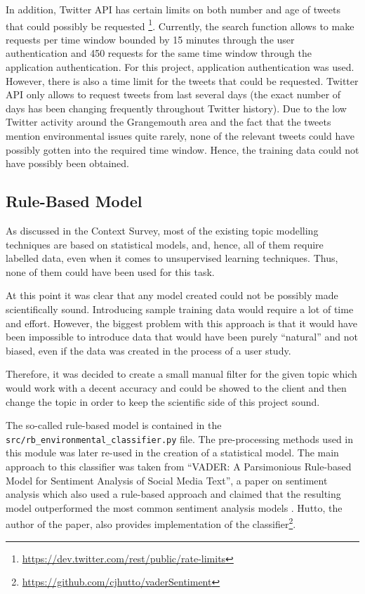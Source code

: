 In addition, Twitter API has certain limits on both number and age of tweets that could possibly be requested \footnote{\url{https://dev.twitter.com/rest/public/rate-limits}}. Currently, the search function allows to make  requests per time window bounded by 15 minutes through the user authentication and 450 requests for the same time window through the application authentication. For this project, application authentication was used. However, there is also a time limit for the tweets that could be requested. Twitter API only allows to request tweets from last several days (the exact number of days has been changing frequently throughout Twitter history). Due to the low Twitter activity around the Grangemouth area and the fact that the tweets mention environmental issues quite rarely, none of the relevant tweets could have possibly gotten into the required time window. Hence, the training data could not have possibly been obtained.

\subsection{Rule-Based Model}
As discussed in the Context Survey, most of the existing topic modelling techniques are based on statistical models, and, hence, all of them require labelled data, even when it comes to unsupervised learning techniques. Thus, none of them could have been used for this task. 

At this point it was clear that any model created could not be possibly made scientifically sound. Introducing sample training data would require a lot of time and effort. However, the biggest problem with this approach is that it would have been impossible to introduce data that would have been purely ``natural'' and not biased, even if the data was created in the process of a user study. 

Therefore, it was decided to create a small manual filter for the given topic which would work with a decent accuracy and could be showed to the client and then change the topic in order to keep the scientific side of this project sound. 

The so-called rule-based model is contained in the \texttt{src/rb\_environmental\_classifier.py} file. The pre-processing methods used in this module was later re-used in the creation of a statistical model. The main approach to this classifier was taken from ``VADER: A Parsimonious Rule-based Model for Sentiment Analysis of Social Media Text'', a paper on sentiment analysis which also used a rule-based approach and claimed that the resulting model outperformed the most common sentiment analysis models \cite{hutto2014vader}. Hutto, the author of the paper, also provides implementation of the classifier\footnote{\url{https://github.com/cjhutto/vaderSentiment}}. 

